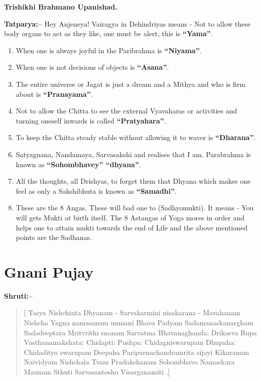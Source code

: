 \begin{flushright}
\textbf{Trishikhi Brahmano Upanishad.}
\end{flushright}

\textbf{Tatparya:–} Hey Anjeneya! Vairagya in Dehindriyas means - Not to allow these body organs to act as they like, one must be alert, this is \textbf{“Yama”}.

\begin{enumerate}
\item When one is always joyful in the Paribrahma is \textbf{“Niyama”}.

 \item When one is not decisions of objects is \textbf{“Asana”}.

 \item The entire universe or Jagat is just a dream and a Mithya and who is firm about is \textbf{“Pranayama”}.

 \item Not to allow the Chitta to see the external Vyavaharas or activities and turning oneself inwards is called \textbf{“Pratyahara”}.

 \item To keep the Chitta steady stable without allowing it to waver is \textbf{“Dharana”}.

 \item Satyagnana, Nandamaya, Sarvasakshi and realises that I am. Parabrahma is known as \textbf{“Sohombhavey” “dhyana”}.

 \item All the thoughts, all Drishyas, to forget them that Dhyana which makes one feel as only a Sakshibhuta is known as \textbf{“Samadhi”}.

 \item These are the 8 Angas. These will bad one to (Sadhyomukti). It means - You will gets Mukti at birth itself. The 8 Astangas of Yoga mores in order and helps one to attain mukti towards the end of Life and the above mentioned points are the Sadhanas.

\end{enumerate}

\chapter{Gnani Pujay}

\textbf{Shruti:–}

\begin{verse}
[ Tasya Nishchinta Dhyanam - Sarvakarmini nisakarana - Mavahanam  Nishcha Yagna namasanam  unmani Bhava Padyam  Sadamanaskanargham  Sada\break deeptara Mritvrithi snanam  Sarvatma Bhavana\break ghanda:  Drikasva Rupa Vasthanamakshata:  Chi\break dapti: Pushpa:  Chidagniswarupam Dhupaha:  Chidaditya swarupam Deepaha  Paripurnachandramrita sijayi Kikaranam Naividyam  Nishchala Tvam Pradakshanam  Sohombhavo Namaskara Maunam Sthuti \break Sarvasantosho Visarganamiti .]
\end{verse}

